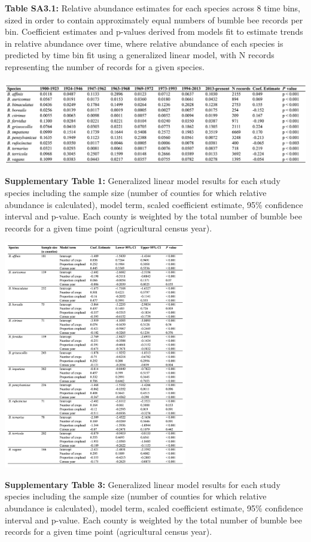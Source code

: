 \documentclass[11pt,]{article}
\begin{document}
\textbf{Table SA3.1:} Relative abundance estimates for each species
across 8 time bins, sized in order to contain approximately equal
numbers of bumble bee records per bin. Coefficient estimates and
p-values derived from models fit to estimate trends in relative
abundance over time, where relative abundance of each species is
predicted by time bin fit using a generalized linear model, with N
records representing the number of records for a given species.

\includegraphics[width=1\textwidth,height=\textheight]{../ms_figs/table1.png}

\clearpage

\textbf{Supplementary Table 1:} Generalized linear model results for
each study species including the sample size (number of counties for
which relative abundance is calculated), model term, scaled coefficient
estimate, 95\% confidence interval and p-value. Each county is weighted
by the total number of bumble bee records for a given time point
(agricultural census year).

\includegraphics[width=0.6\textwidth,height=\textheight]{../ms_figs/tables1.png}

\clearpage

\textbf{Supplementary Table 3:} Generalized linear model results for
each study species including the sample size (number of counties for
which relative abundance is calculated), model term, scaled coefficient
estimate, 95\% confidence interval and p-value. Each county is weighted
by the total number of bumble bee records for a given time point
(agricultural census year).
\end{document}
